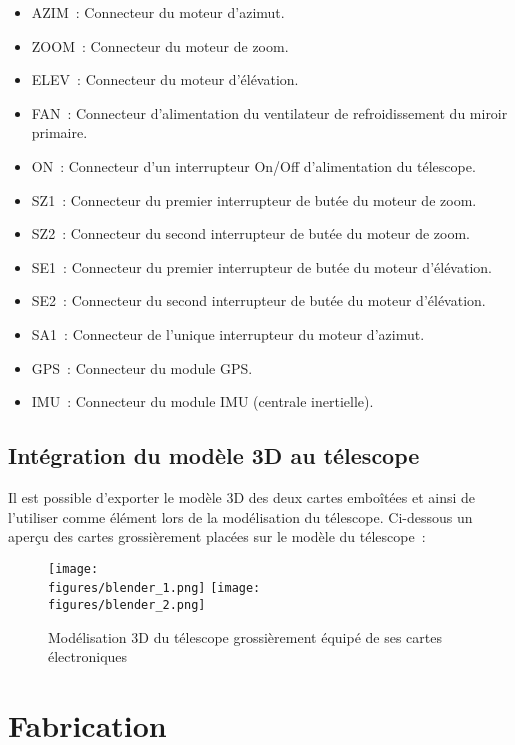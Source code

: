 \begin{itemize}[label=$\bullet$]
	\item AZIM~: Connecteur du moteur d'azimut.
	\item ZOOM~: Connecteur du moteur de zoom.
	\item ELEV~: Connecteur du moteur d'élévation.
	\item FAN~: Connecteur d'alimentation du ventilateur de refroidissement du miroir primaire.
	\item ON~: Connecteur d'un interrupteur On/Off d'alimentation du télescope.
	\item SZ1~: Connecteur du premier interrupteur de butée du moteur de zoom.
	\item SZ2~: Connecteur du second interrupteur de butée du moteur de zoom.
	\item SE1~: Connecteur du premier interrupteur de butée du moteur d'élévation.
	\item SE2~: Connecteur du second interrupteur de butée du moteur d'élévation.
	\item SA1~: Connecteur de l'unique interrupteur du moteur d'azimut.
	\item GPS~: Connecteur du module GPS.
	\item IMU~: Connecteur du module IMU (centrale inertielle).
	\end{itemize}

\subsection{Intégration du modèle 3D au télescope}

Il est possible d'exporter le modèle 3D des deux cartes emboîtées et ainsi de l'utiliser comme élément lors de la modélisation du télescope. Ci-dessous un aperçu des cartes grossièrement placées sur le modèle du télescope~:

\begin{figure}[H]
    \centering
    \texttt{[image: \\figures/blender\_1.png]}
    \texttt{[image: \\figures/blender\_2.png]}
    \decoRule
    \caption[
    Modélisation 3D du télescope grossièrement équipé de ses cartes électroniques]{
    Modélisation 3D du télescope grossièrement équipé de ses cartes électroniques}
    \label{fig:Modélisation 3D du télescope grossièrement équipé de ses cartes électroniques}
    \end{figure}

\section{Fabrication}

